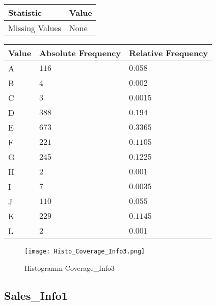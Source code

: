 \begin{table}[H]
	\renewcommand{\arraystretch}{1.25}
	\begin{tabular}{l|l}
		\textbf{Statistic} & \textbf{Value}\\\hline
		Missing Values& None\\\hline
	\end{tabular}
\end{table}
\begin{table}[H]
	\renewcommand{\arraystretch}{1.25}
	\begin{tabular}{l|l|l}
		\textbf{Value} & \textbf{Absolute Frequency} & \textbf{Relative Frequency}\\\hline
		A&$116$&$0.058$\\\hline
		B&$4$&$0.002$\\\hline
		C&$3$&$0.0015$\\\hline
		D&$388$&$0.194$\\\hline
		E&$673$&$0.3365$\\\hline
		F&$221$&$0.1105$\\\hline
		G&$245$&$0.1225$\\\hline
		H&$2$&$0.001$\\\hline
		I&$7$&$0.0035$\\\hline
		J&$110$&$0.055$\\\hline
		K&$229$&$0.1145$\\\hline
		L&$2$&$0.001$
	\end{tabular}
\end{table}
\begin{figure}[H]
	\begin{center}
		\texttt{[image: Histo\_Coverage\_Info3.png]}
	\end{center}
	\caption{Histogramm Coverage\_Info3}
\end{figure}

\subsection{Sales\_Info1}
